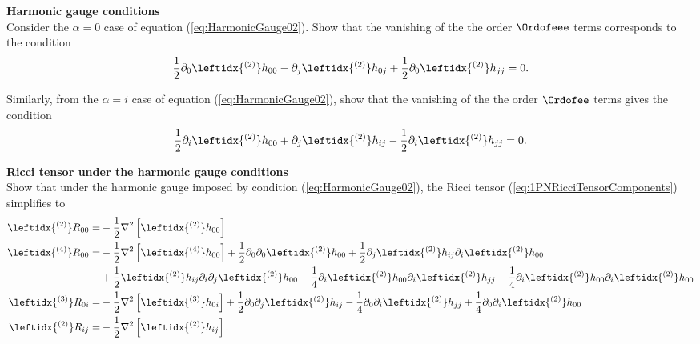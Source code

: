 \begin{exercise}
\textbf{Harmonic gauge conditions}\\
Consider the $\alpha=0$ case of equation (\ref{eq:HarmonicGauge02}). Show that the vanishing of the the order $\Ordofeee$ terms corresponds to the condition
\begin{equation}
\frac{1}{2} \partial_0  \leftidx{ ^{(2)}} h_{00} -  \partial_j  \leftidx{ ^{(2)}} h_{0j} + \frac{1}{2} \partial_0  \leftidx{ ^{(2)}} h_{jj} = 0.\label{eq:GaugeOrder3}
\end{equation}

Similarly, from the $\alpha=i$ case of equation (\ref{eq:HarmonicGauge02}), show that the vanishing of the the order $\Ordofee$ terms gives the condition
\begin{equation}
\frac{1}{2} \partial_i  \leftidx{ ^{(2)}} h_{00} +  \partial_j  \leftidx{ ^{(2)}} h_{ij} - \frac{1}{2} \partial_i  \leftidx{ ^{(2)}} h_{jj} = 0. \label{eq:GaugeOrder2}
\end{equation}
\end{exercise}

\begin{exercise}
\textbf{Ricci tensor under the harmonic gauge conditions}\\
Show that under the harmonic gauge imposed by condition (\ref{eq:HarmonicGauge02}), the Ricci tensor (\ref{eq:1PNRicciTensorComponents}) simplifies to
\begin{subequations}\label{eq:1PNGaugedRicciComponents}
\begin{align}
\leftidx{ ^{(2)}}R_{00} = &- \frac{1}{2} \nabla^2 \left[ \leftidx{ ^{(2)}} h_{00} \right] \\
\leftidx{ ^{(4)}}R_{00} = &- \frac{1}{2} \nabla^2 \left[ \leftidx{ ^{(4)}} h_{00} \right] + \frac{1}{2} \partial_0 \partial_0 \leftidx{ ^{(2)}} h_{00} + \frac{1}{2}  \partial _j \leftidx{ ^{(2)}} h_{ij} \partial _i  \leftidx{ ^{(2)}} h_{00} \notag \\
&  + \frac{1}{2} \leftidx{ ^{(2)}} h_{ij} \partial_i \partial_j \leftidx{ ^{(2)}} h_{00}  - \frac{1}{4} \partial _i \leftidx{ ^{(2)}} h_{00}  \partial _i \leftidx{ ^{(2)}} h_{jj} -\frac{1}{4} \partial _i \leftidx{ ^{(2)}} h_{00}  \partial _i \leftidx{ ^{(2)}} h_{00}  \\
\leftidx{ ^{(3)}}R_{0i} = & - \frac{1}{2} \nabla^2 \left[ \leftidx{ ^{(3)}} h_{0i}\right] + \frac{1}{2} \partial_0 \partial_j \leftidx{ ^{(2)}} h_{ij} - \frac{1}{4} \partial_0 \partial_i \leftidx{ ^{(2)}} h_{jj} + \frac{1}{4} \partial_0 \partial_i \leftidx{ ^{(2)}} h_{00} \\
\leftidx{ ^{(2)}}R_{ij} =& - \frac{1}{2} \nabla^2  \left[\leftidx{ ^{(2)}} h_{ij} \right].
\end{align}
\end{subequations}
\end{exercise}



